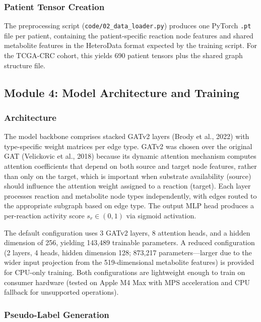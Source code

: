 \documentclass[12pt,a4paper]{article}
\begin{document}
\subsubsection{Patient Tensor Creation}

The preprocessing script (\texttt{code/02\_data\_loader.py}) produces one PyTorch \texttt{.pt} file per patient, containing the patient-specific reaction node features and shared metabolite features in the HeteroData format expected by the training script. For the TCGA-CRC cohort, this yields 690 patient tensors plus the shared graph structure file.

\subsection{Module 4: Model Architecture and Training}

\subsubsection{Architecture}

The model backbone comprises stacked GATv2 layers (Brody et al., 2022) with type-specific weight matrices per edge type. GATv2 was chosen over the original GAT (Velickovic et al., 2018) because its dynamic attention mechanism computes attention coefficients that depend on both source and target node features, rather than only on the target, which is important when substrate availability (source) should influence the attention weight assigned to a reaction (target). Each layer processes reaction and metabolite node types independently, with edges routed to the appropriate subgraph based on edge type. The output MLP head produces a per-reaction activity score $s_r \in (0, 1)$ via sigmoid activation.

The default configuration uses 3 GATv2 layers, 8 attention heads, and a hidden dimension of 256, yielding 143,489 trainable parameters. A reduced configuration (2 layers, 4 heads, hidden dimension 128; 873,217 parameters---larger due to the wider input projection from the 519-dimensional metabolite features) is provided for CPU-only training. Both configurations are lightweight enough to train on consumer hardware (tested on Apple M4 Max with MPS acceleration and CPU fallback for unsupported operations).

\subsubsection{Pseudo-Label Generation}
\end{document}
